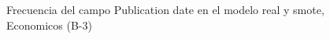 \begin{figure}[H]
    \centering
    
    \caption{Frecuencia del campo Publication date en el modelo real y smote, Economicos (B-3)}
    \label{frecuency-Publication Date-smote-enc}
\end{figure}